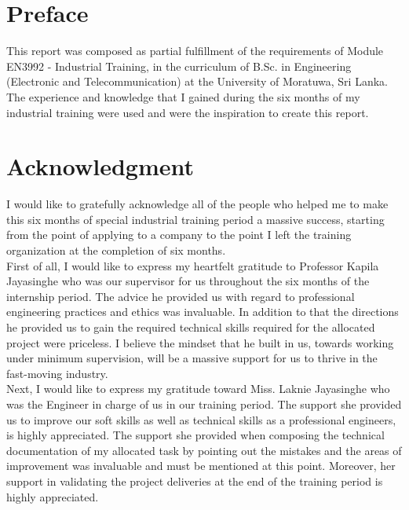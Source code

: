 \documentclass[a4paper,12pt]{report}%
\begin{document}



\chapter*{Preface}
This report was composed as partial fulfillment of the requirements of Module EN3992 - Industrial Training, in the curriculum of B.Sc. in Engineering (Electronic and Telecommunication) at the University of Moratuwa, Sri Lanka. The experience and knowledge that I gained during the six months of my industrial training were used and were the inspiration to create this report.\\

 

\cleardoublepage



\chapter*{Acknowledgment}

I would like to gratefully acknowledge all of the people who helped me to make this six months of special industrial training period a massive success, starting from the point of applying to a company to the point I left the training organization at the completion of six months.\\

First of all, I would like to express my heartfelt gratitude to Professor Kapila Jayasinghe who was our supervisor for us throughout the six months of the internship period. The advice he provided us with regard to professional engineering practices and ethics was invaluable. In addition to that the directions he provided us to gain the required technical skills required for the allocated project were priceless. I believe the mindset that he built in us, towards working under minimum supervision, will be a massive support for us to thrive in the fast-moving industry.\\

Next, I would like to express my gratitude toward Miss. Laknie Jayasinghe who was the Engineer in charge of us in our training period. The support she provided us to improve our soft skills as well as technical skills as a professional engineers, is highly appreciated. The support she provided when composing the technical documentation of my allocated task by pointing out the mistakes and the areas of improvement was invaluable and must be mentioned at this point. Moreover, her support in validating the project deliveries at the end of the training period is highly appreciated.\\
\end{document}
